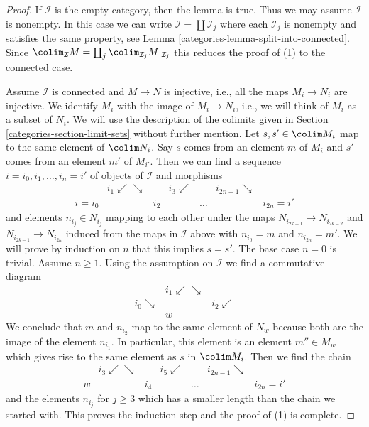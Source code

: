 \begin{proof}

If $\mathcal{I}$ is the empty category, then the lemma is true.
Thus we may assume $\mathcal{I}$ is nonempty. In this case
we can write $\mathcal{I} = \coprod \mathcal{I}_j$ where each
$\mathcal{I}_j$ is nonempty and satisfies the same property, see
Lemma \ref{categories-lemma-split-into-connected}. Since
$\colim_\mathcal{I} M = \coprod_j \colim_{\mathcal{I}_j} M|_{\mathcal{I}_j}$
this reduces the proof of (1) to the connected case.

\medskip\noindent
Assume $\mathcal{I}$ is connected and $M \to N$ is injective, i.e.,
all the maps $M_i \to N_i$ are injective.
We identify $M_i$ with the image of $M_i \to N_i$, i.e.,
we will think of $M_i$ as a subset of $N_i$.
We will use the description of the colimits given in
Section \ref{categories-section-limit-sets} without further mention.
Let $s, s' \in \colim M_i$ map to the same element of $\colim N_i$.
Say $s$ comes from an element $m$ of $M_i$ and $s'$ comes from an
element $m'$ of $M_{i'}$. Then we can find a sequence
$i = i_0, i_1, \ldots, i_n = i'$ of objects of $\mathcal{I}$
and morphisms
$$
\begin{array}{ccccccc} & i_1 \swarrow\searrow &  & i_3 \swarrow &  & i_{2n-1} \searrow &  \\ i = i_0 &  & i_2 &  & \ldots &  & i_{2n} = i'\end{array}
$$
and elements $n_{i_j} \in N_{i_j}$ mapping to each other under
the maps $N_{i_{2k-1}} \to N_{i_{2k-2}}$ and $N_{i_{2k-1}}
\to N_{i_{2k}}$ induced from the maps in $\mathcal{I}$ above
with $n_{i_0} = m$ and $n_{i_{2n}} = m'$. We will prove by induction
on $n$ that this implies $s = s'$. The base case $n = 0$ is trivial.
Assume $n \geq 1$. Using the assumption on $\mathcal{I}$
we find a commutative diagram
$$
\begin{array}{ccc} & i_1 \swarrow\searrow &  \\ i_0 \searrow &  & i_2 \swarrow \\  & w & \end{array}
$$
We conclude that $m$ and $n_{i_2}$ map to the same element of $N_w$
because both are the image of the element $n_{i_1}$.
In particular, this element is an element $m'' \in M_w$ which
gives rise to the same element as $s$ in $\colim M_i$.
Then we find the chain
$$
\begin{array}{ccccccc} & i_3 \swarrow\searrow &  & i_5 \swarrow &  & i_{2n-1} \searrow &  \\ w &  & i_4 &  & \ldots &  & i_{2n} = i'\end{array}
$$
and the elements $n_{i_j}$ for $j \geq 3$ which has a smaller length
than the chain we started with. This proves the induction step and the
proof of (1) is complete.


\end{proof}
